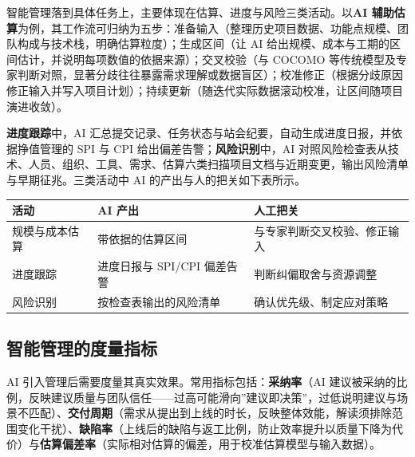\documentclass[12pt,a4paper,twoside,openany]{ctexbook}
\numberwithin{figure}{chapter}
\numberwithin{table}{chapter}
\newcounter{none}
\begin{document}
智能管理落到具体任务上，主要体现在估算、进度与风险三类活动。以\textbf{AI
辅助估算}为例，其工作流可归纳为五步：准备输入（整理历史项目数据、功能点规模、团队构成与技术栈，明确估算粒度）；生成区间（让
AI
给出规模、成本与工期的区间估计，并说明每项数值的依据来源）；交叉校验（与
COCOMO
等传统模型及专家判断对照，显著分歧往往暴露需求理解或数据盲区）；校准修正（根据分歧原因修正输入并写入项目计划）；持续更新（随迭代实际数据滚动校准，让区间随项目演进收敛）。

\textbf{进度跟踪}中，AI
汇总提交记录、任务状态与站会纪要，自动生成进度日报，并依据挣值管理的 SPI
与 CPI 给出偏差告警；\textbf{风险识别}中，AI
对照风险检查表从技术、人员、组织、工具、需求、估算六类扫描项目文档与近期变更，输出风险清单与早期征兆。三类活动中
AI 的产出与人的把关如下表所示。

{\def\LTcaptype{none} %
\begin{longtable}[]{@{}lll@{}}
\toprule\noalign{}
活动 & AI 产出 & 人工把关 \\
\midrule\noalign{}
\endhead
\bottomrule\noalign{}
\endlastfoot
规模与成本估算 & 带依据的估算区间 & 与专家判断交叉校验、修正输入 \\
进度跟踪 & 进度日报与 SPI/CPI 偏差告警 & 判断纠偏取舍与资源调整 \\
风险识别 & 按检查表输出的风险清单 & 确认优先级、制定应对策略 \\
\end{longtable}
}

\subsection{智能管理的度量指标}\label{ux667aux80fdux7ba1ux7406ux7684ux5ea6ux91cfux6307ux6807}

AI 引入管理后需要度量其真实效果。常用指标包括：\textbf{采纳率}（AI
建议被采纳的比例，反映建议质量与团队信任------过高可能滑向''建议即决策''，过低说明建议与场景不匹配）、\textbf{交付周期}（需求从提出到上线的时长，反映整体效能，解读须排除范围变化干扰）、\textbf{缺陷率}（上线后的缺陷与返工比例，防止效率提升以质量下降为代价）与\textbf{估算偏差率}（实际相对估算的偏差，用于校准估算模型与输入数据）。
\end{document}
